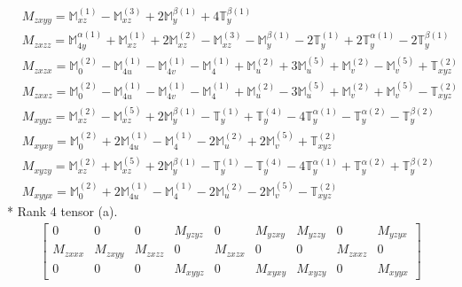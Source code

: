 \documentclass[fleqn,8pt,landscape]{jsarticle}
\begin{document}
\begin{align*}
& M_{zxyy} = \mathbb{M}_{xz}^{(1)} - \mathbb{M}_{xz}^{(3)} + 2 \mathbb{M}_{y}^{\beta(1)} + 4 \mathbb{T}_{y}^{\beta(1)} \\
& M_{zxzz} = \mathbb{M}_{4y}^{\alpha(1)} + \mathbb{M}_{xz}^{(1)} + 2 \mathbb{M}_{xz}^{(2)} - \mathbb{M}_{xz}^{(3)} - \mathbb{M}_{y}^{\beta(1)} - 2 \mathbb{T}_{y}^{(1)} + 2 \mathbb{T}_{y}^{\alpha(1)} - 2 \mathbb{T}_{y}^{\beta(1)} \\
& M_{zxzx} = \mathbb{M}_{0}^{(2)} - \mathbb{M}_{4u}^{(1)} - \mathbb{M}_{4v}^{(1)} - \mathbb{M}_{4}^{(1)} + \mathbb{M}_{u}^{(2)} + 3 \mathbb{M}_{u}^{(5)} + \mathbb{M}_{v}^{(2)} - \mathbb{M}_{v}^{(5)} + \mathbb{T}_{xyz}^{(2)} \\
& M_{zxxz} = \mathbb{M}_{0}^{(2)} - \mathbb{M}_{4u}^{(1)} - \mathbb{M}_{4v}^{(1)} - \mathbb{M}_{4}^{(1)} + \mathbb{M}_{u}^{(2)} - 3 \mathbb{M}_{u}^{(5)} + \mathbb{M}_{v}^{(2)} + \mathbb{M}_{v}^{(5)} - \mathbb{T}_{xyz}^{(2)} \\
& M_{xyyz} = \mathbb{M}_{xz}^{(2)} - \mathbb{M}_{xz}^{(5)} + 2 \mathbb{M}_{y}^{\beta(1)} - \mathbb{T}_{y}^{(1)} + \mathbb{T}_{y}^{(4)} - 4 \mathbb{T}_{y}^{\alpha(1)} - \mathbb{T}_{y}^{\alpha(2)} - \mathbb{T}_{y}^{\beta(2)} \\
& M_{xyxy} = \mathbb{M}_{0}^{(2)} + 2 \mathbb{M}_{4u}^{(1)} - \mathbb{M}_{4}^{(1)} - 2 \mathbb{M}_{u}^{(2)} + 2 \mathbb{M}_{v}^{(5)} + \mathbb{T}_{xyz}^{(2)} \\
& M_{xyzy} = \mathbb{M}_{xz}^{(2)} + \mathbb{M}_{xz}^{(5)} + 2 \mathbb{M}_{y}^{\beta(1)} - \mathbb{T}_{y}^{(1)} - \mathbb{T}_{y}^{(4)} - 4 \mathbb{T}_{y}^{\alpha(1)} + \mathbb{T}_{y}^{\alpha(2)} + \mathbb{T}_{y}^{\beta(2)} \\
& M_{xyyx} = \mathbb{M}_{0}^{(2)} + 2 \mathbb{M}_{4u}^{(1)} - \mathbb{M}_{4}^{(1)} - 2 \mathbb{M}_{u}^{(2)} - 2 \mathbb{M}_{v}^{(5)} - \mathbb{T}_{xyz}^{(2)}
\end{align*}
* Rank 4 tensor (a).
\begin{align*}
\begin{bmatrix} 0 & 0 & 0 & M_{yzyz} & 0 & M_{yzxy} & M_{yzzy} & 0 & M_{yzyx} \\ M_{zxxx} & M_{zxyy} & M_{zxzz} & 0 & M_{zxzx} & 0 & 0 & M_{zxxz} & 0 \\ 0 & 0 & 0 & M_{xyyz} & 0 & M_{xyxy} & M_{xyzy} & 0 & M_{xyyx} \end{bmatrix}
\end{align*}
\end{document}
